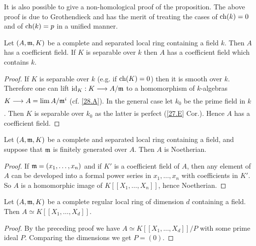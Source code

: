 \documentclass[../main]{subfiles}
\begin{document}
\begin{remark}
 It is also possible to give a non-homological proof of the proposition. The above proof is due to Grothendieck and has the merit of treating the cases of $\operatorname{ch}(k)=0$ and of $\operatorname{ch}(k)=p$ in a unified manner.
\end{remark}
\begin{partheorem}[I.S Cohen]\label{thm:060}
 Let $(A,\mathfrak{m},K)$ be a complete and separated local ring containing a field $k$. Then $A$ has a coefficient field. If $K$ is separable over $k$ then $A$ has a coefficient field which contains $k$.
\end{partheorem}
\begin{proof}
If $K$ is separable over $k$ (e.g. if $\operatorname{ch}(K)=0$) then it is smooth over $k$. Therefore one can lift $\id_K: K \varrightarrow{} A/\ideal{m}$ to a homomorphism of $k$-algebras \newline $K \varrightarrow{} A=\lim A/\ideal{m}^i$ (cf. \ref{28.A}). In the general case let $k_0$ be the prime field in $k$. Then $K$ is separable over $k_0$ as the latter is perfect (\ref{27.E} Cor.). Hence $A$ has a coefficient field.
\end{proof}
\begin{corollary}\label{cor:28.01}
Let $(A, \mathfrak{m}, K)$ be a complete and separated local ring containing a field, and suppose that $\mathfrak{m}$ is finitely generated over $A$. Then $A$ is Noetherian.
\end{corollary}
\begin{proof}
 If $\mathfrak{m}=(x_1, \dots, x_n)$ and if $K'$ is a coefficient field of $A$, then any element of $A$ can be developed into a formal power series in $x_1, \ldots, x_n$ with coefficients in $K'$. So $A$ is a homomorphic image of $K[[X_1, \ldots, X_n]]$, hence Noetherian.
\end{proof}

\begin{corollary}\label{cor:28.02}
Let $(A, \mathfrak{m}, K)$ be a complete regular local ring of dimension $d$ containing a field. Then $A \simeq K[[X_1, \ldots, X_d]]$.
\end{corollary}
\begin{proof}
 By the preceding proof we have $A \simeq K[[X_1, \ldots, X_d]] / P$ with some prime ideal $P$. Comparing the dimensions we get $P=(0)$.
\end{proof}
\end{document}

